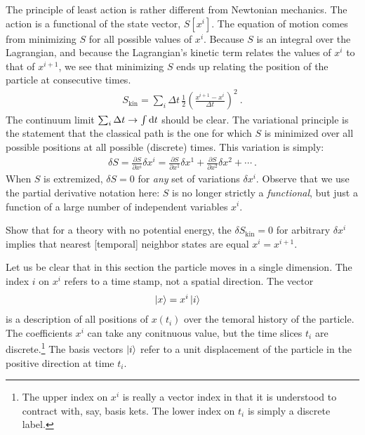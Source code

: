 The principle of least action is rather different from Newtonian mechanics. The action is a functional of the state vector, $S[x^i]$. The equation of motion comes from minimizing $S$ for all possible values of $x^i$. Because $S$ is an integral over the Lagrangian, and because the Lagrangian's kinetic term relates the values of $x^i$ to that of $x^{i+1}$, we see that minimizing $S$ ends up relating the position of the particle at consecutive times.
\begin{align}
    S_\text{kin} = 
    \sum_{i} \Delta t \,
    \frac{1}{2} 
    \left(
        \frac{ x^{i+1} - x^i }{ \Delta t }
    \right)^2 \ .
\end{align}
The continuum limit $\sum_i \Delta t \to \int \operatorname{d}\mkern-3mu^{}\mkern-1mu{t}$ should be clear. The variational principle is the statement that the classical path is the one for which $S$ is minimized over all possible positions at all possible (discrete) times. This variation is simply:
\begin{align}
    \delta S = \frac{\partial{S}}{\partial{x^i}}\delta x^i
    = 
    \frac{\partial{S}}{\partial{x^1}}\delta x^1
    +
    \frac{\partial{S}}{\partial{x^2}}\delta x^2
    + 
    \cdots \ .
    \label{eq:S:partial}
\end{align}
When $S$ is extremized, $\delta S = 0$ for \emph{any} set of variations $\delta x^i$.  Observe that we use the partial derivative notation here: $S$ is no longer strictly a \emph{functional}, but just a function of a large number of independent variables $x^i$. 
\begin{exercise}
Show that for a theory with no potential energy, the $\delta S_\text{kin}=0$ for arbitrary $\delta x^i$ implies that nearest [temporal] neighbor states are equal $x^i = x^{i+1}$. 
\end{exercise}

Let us be clear that in this section the particle moves in a single dimension. The index $i$ on $x^i$ refers to a time stamp, not a spatial direction. The vector 
\begin{align}
    \left|x\right\rangle &= x^i \left|i\right\rangle 
\end{align}
is a description of all positions of $x(t_i)$ over the temoral history of the particle. The coefficients $x^i$ can take any conitnuous value, but the time slices $t_i$ are discrete.\footnote{The upper index on $x^i$ is really a vector index in that it is understood to contract with, say, basis kets. The lower index on $t_i$ is simply a discrete label.} The basis vectors $\left|i\right\rangle$ refer to a unit displacement of the particle in the positive direction at time $t_i$.




